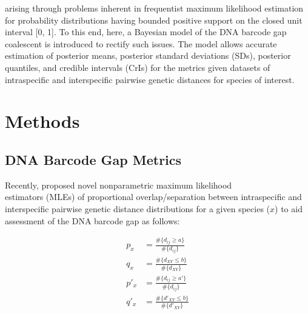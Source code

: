 \documentclass[12pt]{article}
\begin{document}
arising through problems inherent in frequentist maximum likelihood estimation for probability distributions having bounded positive support on the closed unit interval [0, 1]. To this end, here, a Bayesian model of the DNA barcode gap coalescent is introduced to rectify such issues. The model allows accurate estimation of posterior means, posterior standard deviations (SDs), posterior quantiles, and credible intervals (CrIs) for the metrics given datasets of intraspecific and interspecific pairwise genetic distances for species of interest.


\section{Methods}

\subsection{DNA Barcode Gap Metrics}

Recently, \citet{phillips2024measure} proposed novel nonparametric maximum likelihood \\ estimators (MLEs) of proportional overlap/separation between intraspecific and interspecific pairwise genetic distance distributions for a given species ($x$) to aid assessment of the DNA barcode gap as follows:

\begin{align}
p_x &= \frac{\#\{d_{ij} \geq a\}}{\#\{d_{ij}\}} \\[1mm]
q_x &= \frac{\#\{d_{XY} \leq b\}}{\#\{d_{XY}\}} \\[1mm]
p'_x &= \frac{\#\{d_{ij} \geq a'\}}{\#\{d_{ij}\}} \\[1mm]
q'_x &= \frac{\#\{d'_{XY} \leq b\}}{\#\{d'_{XY}\}}
\end{align}
\end{document}
